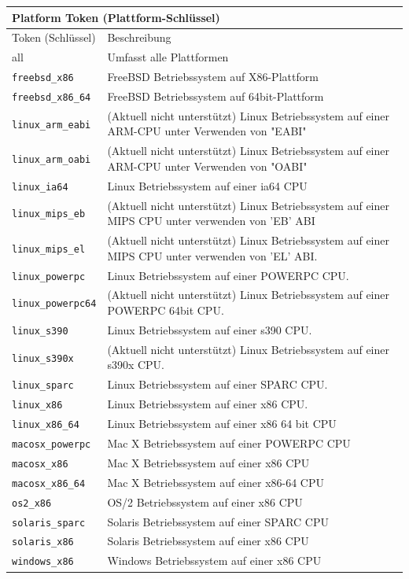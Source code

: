 \documentclass[12pt,a4paper,titlepage]{book}
\begin{document}
\begin{tabular}{ |p{3cm}|p{9cm} | }
	
	\multicolumn{2}{l}{\textbf{Platform Token (Plattform-Schlüssel)}}\\
	\toprule
	\rowcolor{hellgrau}
	Token (Schlüssel)& Beschreibung\\
	\hline
	all   & Umfasst alle Plattformen\\
	\hline
	\verb|freebsd_x86|& FreeBSD Betriebssystem auf X86-Plattform\\
	\hline
	\verb|freebsd_x86_64|& FreeBSD Betriebssystem auf 64bit-Plattform\\
	\hline
	\verb|linux_arm_eabi|& (Aktuell nicht unterstützt) Linux Betriebssystem auf einer ARM-CPU unter Verwenden von "EABI"\\
	\hline
	\verb|linux_arm_oabi|& (Aktuell nicht unterstützt) Linux Betriebssystem auf einer ARM-CPU unter Verwenden von "OABI"\\
	\hline
	\verb|linux_ia64| &	Linux Betriebssystem auf einer ia64 CPU\\
	\hline
	\verb|linux_mips_eb| &	(Aktuell nicht unterstützt) Linux Betriebssystem auf einer MIPS CPU unter verwenden von 'EB' ABI\\
	\hline
	\verb|linux_mips_el| &	(Aktuell nicht unterstützt) Linux Betriebssystem auf einer MIPS CPU unter verwenden von 'EL' ABI.\\
	\hline
	\verb|linux_powerpc| &	Linux Betriebssystem auf einer POWERPC CPU.\\
	\hline
	\verb|linux_powerpc64| & (Aktuell nicht unterstützt) Linux Betriebssystem auf einer POWERPC 64bit CPU.\\
	\hline
	\verb|linux_s390| &	Linux Betriebssystem auf einer s390 CPU.\\
	\hline
	\verb|linux_s390x| & (Aktuell nicht unterstützt) Linux Betriebssystem auf einer s390x CPU.\\
	\hline
	\verb|linux_sparc| & Linux Betriebssystem auf einer SPARC CPU.\\
	\hline
	\verb|linux_x86| &	Linux Betriebssystem auf einer x86 CPU.\\
	\hline
	\verb|linux_x86_64| & Linux Betriebssystem auf einer x86 64 bit CPU\\
	\hline
	\verb|macosx_powerpc| &	Mac X Betriebssystem auf einer POWERPC CPU\\
	\hline
	\verb|macosx_x86| &	Mac X Betriebssystem auf einer x86 CPU\\
	\hline
	\verb|macosx_x86_64| & 	Mac X Betriebssystem auf einer x86-64 CPU\\
	\hline
	\verb|os2_x86| & OS/2 Betriebssystem auf einer x86 CPU\\
	\hline
	\verb|solaris_sparc| & 	Solaris Betriebssystem auf einer SPARC CPU\\
	\hline
	\verb|solaris_x86| & Solaris Betriebssystem auf einer x86 CPU\\
	\hline
	\verb|windows_x86| & Windows Betriebssystem auf einer x86 CPU\\ 
	\bottomrule
\end{tabular}
\end{document}
